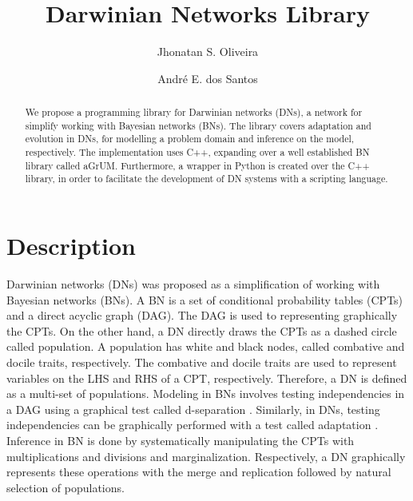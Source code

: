 \documentclass[runningheads,a4paper]{llncs}
\begin{document}
\mainmatter
\title{Darwinian Networks Library}

\author{Jhonatan S. Oliveira \and André E. dos Santos}


\maketitle

\begin{abstract}
We propose a programming library for Darwinian networks (DNs), a network for simplify working with Bayesian networks (BNs).
The library covers adaptation and evolution in DNs, for modelling a problem domain and inference on the model, respectively.
The implementation uses C++, expanding over a well established BN library called aGrUM.
Furthermore, a wrapper in Python is created over the C++ library, in order to facilitate the development of DN systems with a scripting language.
\end{abstract}

\section*{Description}


Darwinian networks (DNs) \cite{butzOliveiraSantosCai15} was proposed as a simplification of working with Bayesian networks \cite{pear88} (BNs).
A BN is a set of conditional probability tables (CPTs) and a direct acyclic graph (DAG).
The DAG is used to representing graphically the CPTs.
On the other hand, a DN directly draws the CPTs as a dashed circle called population.
A population has white and black nodes, called combative and docile traits, respectively.
The combative and docile traits are used to represent variables on the LHS and RHS of a CPT, respectively.
Therefore, a DN is defined as a multi-set of populations.
Modeling in BNs involves testing independencies in a DAG using a graphical test called d-separation \cite{pear88}.
Similarly, in DNs, testing independencies can be graphically performed with a test called adaptation \cite{butzOliveiraSantosCai15}.
Inference in BN is done by systematically manipulating the CPTs with multiplications and divisions and marginalization.
Respectively, a DN graphically represents these operations with the merge and replication followed by natural selection of populations.
\end{document}

